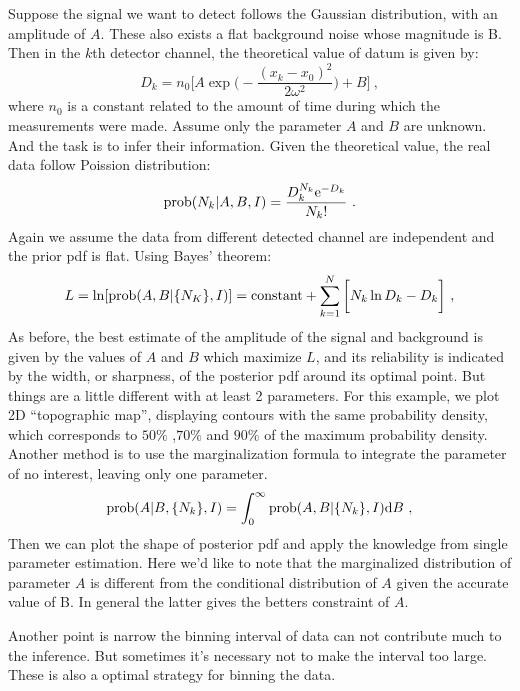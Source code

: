 \documentclass[11pt, a4paper]{article}
\begin{document}
Suppose the signal we want to detect follows the Gaussian distribution, with an amplitude of $A$. These also exists a flat background noise whose magnitude is B. Then in the $k$th detector channel, the theoretical value of datum is given by:
\begin{equation}
D_k=n_0\bigg [A\exp \bigg(-\frac{(x_k-x_0)^2}{2\omega^2}\bigg)+B\bigg]~,
\end{equation}
where $n_0$ is a constant related to the amount of time during which the measurements were made. Assume only the parameter $A$ and $B$ are unknown. And the task is to infer their information. Given the theoretical value, the real data follow Poission distribution:
\begin{equation}
{\rm prob}(N_k|A,B,I)=\frac{D_k^{N_k}{\rm e}^{-D_k}}{N_k!}~.
\end{equation}
Again we assume the data from different detected channel are independent and the prior pdf is flat. Using Bayes' theorem:
\begin{equation}
L=\ln [{\rm prob}(A,B|\{N_K\},I)]={\rm constant}+\sum_{k=1}^{N} \bigg[N_k\ln D_k-D_k\bigg]~,
\end{equation}
As before, the best estimate of the amplitude of the signal and background is given by the values of $A$ and $B$ which maximize $L$, and its reliability is indicated by the width, or sharpness, of the posterior pdf around its optimal point. But things are a little different with at least 2 parameters. For this example, we plot 2D ``topographic map'', displaying contours with the same probability density, which corresponds to  $50\%$ ,$70\%$  and $90\%$ of the maximum probability density. Another method is to use the marginalization formula to integrate the parameter of no interest, leaving only one parameter. 
\begin{equation}
{\rm prob}(A|B,\{N_k\},I)=\int_0^\infty {\rm prob}(A,B|\{N_k\},I){\rm d}B~,
\end{equation}
Then we can plot the shape of posterior pdf and apply the knowledge from single parameter estimation. Here we'd like to note that the marginalized distribution of parameter $A$ is different from the conditional distribution of $A$ given the accurate value of B. In general the latter gives the betters constraint of $A$.

Another point is narrow the binning interval of data can not contribute much to the inference. But sometimes it's necessary not to make the interval too large. These is also a optimal strategy for binning the data.
\end{document}
